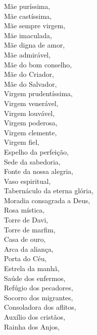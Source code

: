 \begin{flushleft}
    \VbarRed{} Mãe puríssima, \\
    \VbarRed{} Mãe castíssima, \\
    \VbarRed{} Mãe sempre virgem, \\
    \VbarRed{} Mãe imaculada, \\
    \VbarRed{} Mãe digna de amor, \\
    \VbarRed{} Mãe admirável, \\
    \VbarRed{} Mãe do bom conselho, \\
    \VbarRed{} Mãe do Criador, \\
    \VbarRed{} Mãe do Salvador, \\
    \VbarRed{} Virgem prudentíssima, \\
    \VbarRed{} Virgem venerável, \\
    \VbarRed{} Virgem louvável, \\
    \VbarRed{} Virgem poderosa, \\
    \VbarRed{} Virgem clemente, \\
    \VbarRed{} Virgem fiel, \\
    \VbarRed{} Espelho da perfeição, \\
    \VbarRed{} Sede da sabedoria, \\
    \VbarRed{} Fonte da nossa alegria, \\
    \VbarRed{} Vaso espiritual, \\
    \VbarRed{} Tabernáculo da eterna glória, \\
    \VbarRed{} Moradia consagrada a Deus, \\
    \VbarRed{} Rosa mística, \\
    \VbarRed{} Torre de Davi, \\
    \VbarRed{} Torre de marfim, \\
    \VbarRed{} Casa de ouro, \\
    \VbarRed{} Arca da aliança, \\
    \VbarRed{} Porta do Céu, \\
    \VbarRed{} Estrela da manhã, \\
    \VbarRed{} Saúde dos enfermos, \\
    \VbarRed{} Refúgio dos pecadores, \\
    \VbarRed{} Socorro dos migrantes, \\
    \VbarRed{} Consoladora dos aflitos, \\
    \VbarRed{} Auxílio dos cristãos, \\
    \VbarRed{} Rainha dos Anjos, \\

\end{flushleft}
